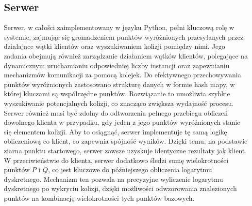 \subsection{Serwer}
Serwer, w całości zaimplementowany w języku Python, pełni kluczową rolę w systemie,
zajmując się gromadzeniem punktów wyróżnionych przesyłanych przez działające wątki klientów oraz wyszukiwaniem
kolizji pomiędzy nimi. Jego zadania obejmują również zarządzanie działaniem
wątków klientów, polegające na dynamicznym uruchamianiu odpowiedniej liczby instancji
oraz zapewnianiu mechanizmów komunikacji za pomocą kolejek.
Do efektywnego przechowywania punktów wyróżnionych zastosowano strukturę danych w formie
hash mapy, w której kluczami są współrzędne punktów.
Rozwiązanie to umożliwia szybkie wyszukiwanie potencjalnych kolizji,
co znacząco zwiększa wydajność procesu.
Serwer również musi być zdolny do odtworzenia pełnego przebiegu obliczeń dowolnego klienta w przypadku,
gdy jeden z jego punktów wyróżnionych stanie się elementem kolizji.
Aby to osiągnąć, serwer implementuje tę samą logikę obliczeniową co klient,
co zapewnia spójność wyników. Dzięki temu, na podstawie ziarna punktu startowego, serwer zawsze uzyskuje identyczne
rezultaty jak klient.
W przeciwieństwie do klienta,
serwer dodatkowo śledzi sumę wielokrotności punktów $P$ i $Q$,
co jest kluczowe do późniejszego obliczenia logarytmu dyskretnego.
Mechanizm ten pozwala na precyzyjne wyliczenie logarytmu dyskretnego po wykryciu kolizji, dzięki możliwości
odwzorowania znalezionych punktów na kombinację wielokrotności tych punktów bazowych.

